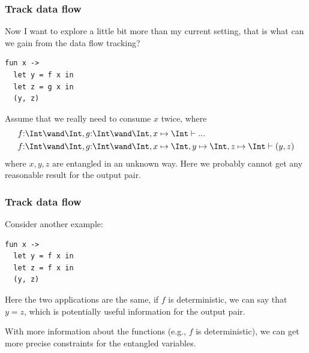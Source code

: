 \begin{frame}[fragile]
    \frametitle{Track data flow}   

Now I want to explore a little bit more than my current setting, that is what can we gain from the data flow tracking?

\begin{verbatim}
fun x -> 
  let y = f x in
  let z = g x in
  (y, z)
\end{verbatim}

Assume that we really need to consume $x$ twice, where
\begin{align*}
    &f{:}\Int\wand\Int, g{:}\Int\wand\Int, x \mapsto \Int \vdash ... \\
    &f{:}\Int\wand\Int, g{:}\Int\wand\Int, x\mapsto\Int, y\mapsto\Int, z\mapsto\Int \vdash (y, z) \\
\end{align*}
where $x, y, z$ are entangled in an unknown way. Here we probably cannot get any reasonable result for the output pair.

\end{frame}

\begin{frame}[fragile]
    \frametitle{Track data flow}   

Consider another example:

\begin{verbatim}
fun x -> 
  let y = f x in
  let z = f x in
  (y, z)
\end{verbatim}

Here the two applications are the same, if $f$ is deterministic, we can say that $y = z$, which is potentially useful information for the output pair.

With more information about the functions (e.g., $f$ is deterministic), we can get more precise constraints for the entangled variables.

\end{frame}
